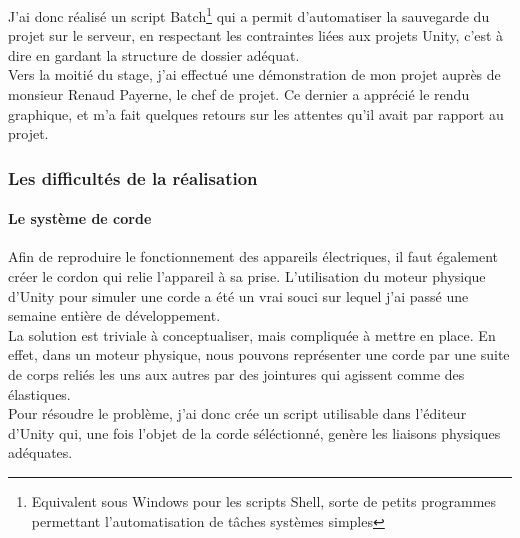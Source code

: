 \documentclass[a4paper]{article}
\begin{document}
    J'ai donc réalisé un script Batch\footnote{Equivalent sous Windows pour les scripts Shell, sorte de petits programmes permettant l'automatisation de tâches systèmes simples} qui a permit d'automatiser la sauvegarde du projet sur le serveur, en respectant les contraintes liées aux projets Unity, c'est à dire en gardant la structure de dossier adéquat. \\

    Vers la moitié du stage, j'ai effectué une démonstration de mon projet auprès de monsieur Renaud Payerne, le chef de projet. Ce dernier a apprécié le rendu graphique, et m'a fait quelques retours sur les attentes qu'il avait par rapport au projet. \\

    \subsubsection{Les difficultés de la réalisation}

    \paragraph{Le système de corde}

    Afin de reproduire le fonctionnement des appareils électriques, il faut également créer le cordon qui relie l'appareil à sa prise. L'utilisation du moteur physique d'Unity pour simuler une corde a été un vrai souci sur lequel j'ai passé une semaine entière de développement. \\

    La solution est triviale à conceptualiser, mais compliquée à mettre en place. En effet, dans un moteur physique, nous pouvons représenter une corde par une suite de corps reliés les uns aux autres par des jointures qui agissent comme des élastiques. \\

    Pour résoudre le problème, j'ai donc crée un script utilisable dans l'éditeur d'Unity qui, une fois l'objet de la corde séléctionné, genère les liaisons physiques adéquates. \\ 
\end{document}
